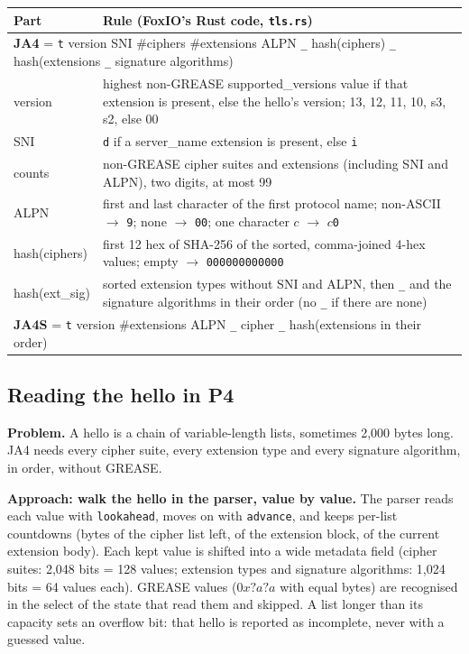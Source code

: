 \documentclass[11pt,a4paper]{article}
\newcommand{\code}[1]{\texttt{#1}}
\begin{document}
\begin{tabularx}{\textwidth}{l X}
\toprule
\textbf{Part} & \textbf{Rule (FoxIO's Rust code, \code{tls.rs})} \\
\midrule
\multicolumn{2}{l}{\textbf{JA4} = \code{t} version SNI \#ciphers \#extensions ALPN \code{\_} hash(ciphers) \code{\_} hash(extensions \code{\_} signature algorithms)} \\
version & highest non-GREASE supported\_versions value if that extension is present, else the hello's version; 13, 12, 11, 10, s3, s2, else 00 \\
SNI & \code{d} if a server\_name extension is present, else \code{i} \\
counts & non-GREASE cipher suites and extensions (including SNI and ALPN), two digits, at most 99 \\
ALPN & first and last character of the first protocol name; non-ASCII $\rightarrow$ \code{9}; none $\rightarrow$ \code{00}; one character $c$ $\rightarrow$ $c$\code{0} \\
hash(ciphers) & first 12 hex of SHA-256 of the sorted, comma-joined 4-hex values; empty $\rightarrow$ \code{000000000000} \\
hash(ext\_sig) & sorted extension types without SNI and ALPN, then \code{\_} and the signature algorithms in their order (no \code{\_} if there are none) \\
\midrule
\multicolumn{2}{l}{\textbf{JA4S} = \code{t} version \#extensions ALPN \code{\_} cipher \code{\_} hash(extensions in their order)} \\
\bottomrule
\end{tabularx}

\subsection{Reading the hello in P4}

\textbf{Problem.} A hello is a chain of variable-length lists, sometimes 2,000 bytes long. JA4 needs every cipher
suite, every extension type and every signature algorithm, in order, without GREASE.

\textbf{Approach: walk the hello in the parser, value by value.} The parser reads each value with \code{lookahead},
moves on with \code{advance}, and keeps per-list countdowns (bytes of the cipher list left, of the extension block,
of the current extension body). Each kept value is shifted into a wide metadata field (cipher suites: 2,048 bits =
128 values; extension types and signature algorithms: 1,024 bits = 64 values each). GREASE values ($0x?a?a$ with
equal bytes) are recognised in the select of the state that read them and skipped. A list longer than its capacity
sets an overflow bit: that hello is reported as incomplete, never with a guessed value.
\end{document}
